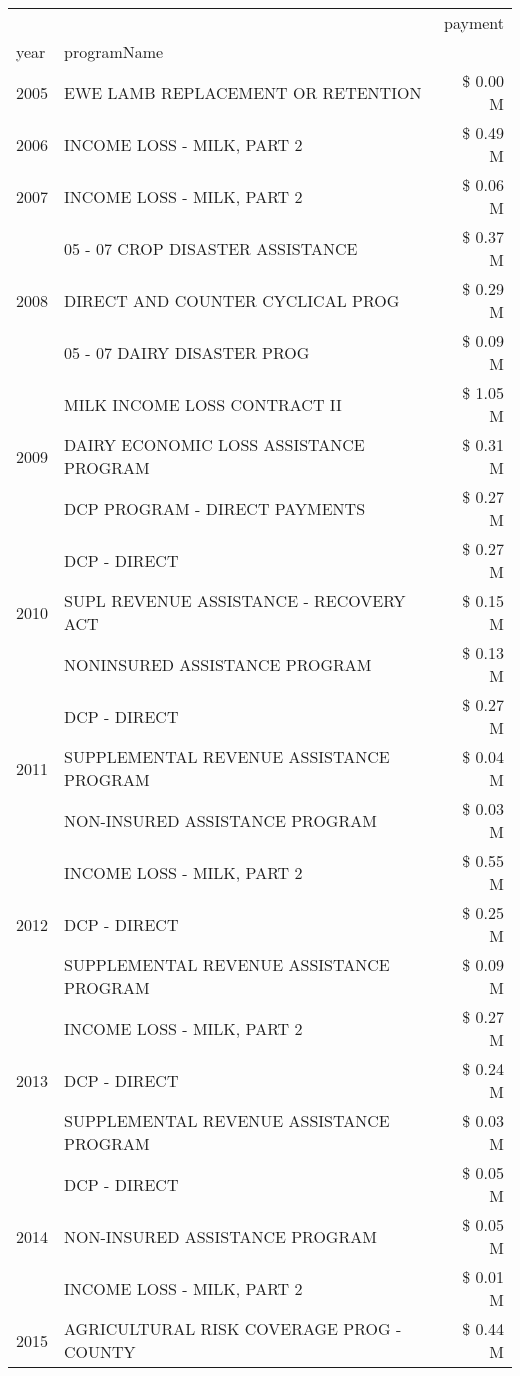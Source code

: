 \begin{tabular}{llr}
\toprule
 &  & payment \\
year & programName &  \\
\midrule
2005 & EWE LAMB REPLACEMENT OR RETENTION & \$ 0.00 M \\
\cline{1-3}
2006 & INCOME LOSS - MILK, PART 2 & \$ 0.49 M \\
\cline{1-3}
2007 & INCOME LOSS - MILK, PART 2 & \$ 0.06 M \\
\cline{1-3}
\multirow[t]{3}{*}{2008} & 05 - 07 CROP DISASTER ASSISTANCE & \$ 0.37 M \\
 & DIRECT AND COUNTER CYCLICAL PROG & \$ 0.29 M \\
 & 05 - 07 DAIRY DISASTER PROG & \$ 0.09 M \\
\cline{1-3}
\multirow[t]{3}{*}{2009} & MILK INCOME LOSS CONTRACT II & \$ 1.05 M \\
 & DAIRY ECONOMIC LOSS ASSISTANCE PROGRAM & \$ 0.31 M \\
 & DCP PROGRAM - DIRECT PAYMENTS & \$ 0.27 M \\
\cline{1-3}
\multirow[t]{3}{*}{2010} & DCP - DIRECT & \$ 0.27 M \\
 & SUPL REVENUE ASSISTANCE - RECOVERY ACT & \$ 0.15 M \\
 & NONINSURED ASSISTANCE PROGRAM & \$ 0.13 M \\
\cline{1-3}
\multirow[t]{3}{*}{2011} & DCP - DIRECT & \$ 0.27 M \\
 & SUPPLEMENTAL REVENUE ASSISTANCE PROGRAM & \$ 0.04 M \\
 & NON-INSURED ASSISTANCE PROGRAM & \$ 0.03 M \\
\cline{1-3}
\multirow[t]{3}{*}{2012} & INCOME LOSS - MILK, PART 2 & \$ 0.55 M \\
 & DCP - DIRECT & \$ 0.25 M \\
 & SUPPLEMENTAL REVENUE ASSISTANCE PROGRAM & \$ 0.09 M \\
\cline{1-3}
\multirow[t]{3}{*}{2013} & INCOME LOSS - MILK, PART 2 & \$ 0.27 M \\
 & DCP - DIRECT & \$ 0.24 M \\
 & SUPPLEMENTAL REVENUE ASSISTANCE PROGRAM & \$ 0.03 M \\
\cline{1-3}
\multirow[t]{3}{*}{2014} & DCP - DIRECT & \$ 0.05 M \\
 & NON-INSURED ASSISTANCE PROGRAM & \$ 0.05 M \\
 & INCOME LOSS - MILK, PART 2 & \$ 0.01 M \\
\cline{1-3}
\multirow[t]{3}{*}{2015} & AGRICULTURAL RISK COVERAGE PROG - COUNTY & \$ 0.44 M \\

\end{tabular}
